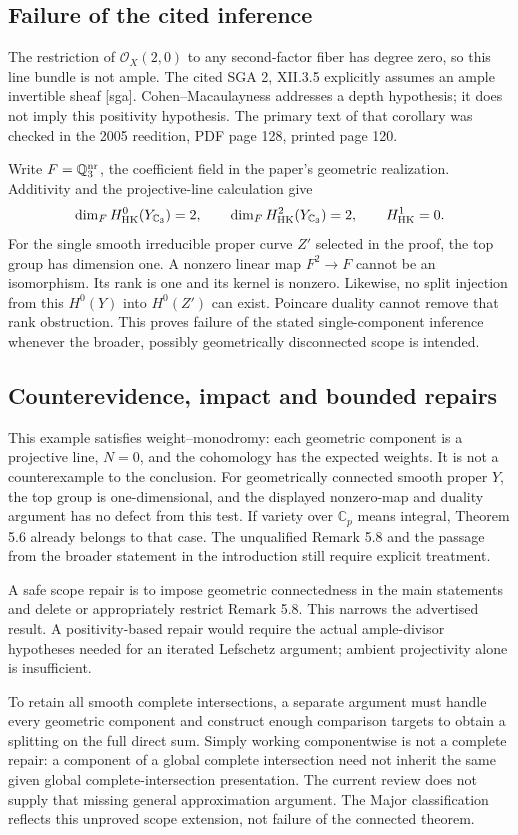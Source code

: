 \documentclass[10pt]{article}
\begin{document}
\subsection*{Failure of the cited inference}
The restriction of \(\mathcal O_X(2,0)\) to any second-factor fiber has degree zero, so this line bundle is not ample. The cited SGA 2, XII.3.5 explicitly assumes an ample invertible sheaf [sga]. Cohen–Macaulayness addresses a depth hypothesis; it does not imply this positivity hypothesis. The primary text of that corollary was checked in the 2005 reedition, PDF page 128, printed page 120.\par
Write \(F=\mathbb Q_3^{\rm nr}\), the coefficient field in the paper’s geometric realization. Additivity and the projective-line calculation give \[\dim_F H^0_{\rm HK}(Y_{\mathbb C_3})=2,\qquad
 \dim_F H^2_{\rm HK}(Y_{\mathbb C_3})=2,\qquad H^1_{\rm HK}=0.\] For the single smooth irreducible proper curve \(Z'\) selected in the proof, the top group has dimension one. A nonzero linear map \(F^2\to F\) cannot be an isomorphism. Its rank is one and its kernel is nonzero. Likewise, no split injection from this \(H^0(Y)\) into \(H^0(Z')\) can exist. Poincare duality cannot remove that rank obstruction. This proves failure of the stated single-component inference whenever the broader, possibly geometrically disconnected scope is intended.\par
\subsection*{Counterevidence, impact and bounded repairs}
This example satisfies weight–monodromy: each geometric component is a projective line, \(N=0\), and the cohomology has the expected weights. It is not a counterexample to the conclusion. For geometrically connected smooth proper \(Y\), the top group is one-dimensional, and the displayed nonzero-map and duality argument has no defect from this test. If variety over \(\mathbb C_p\) means integral, Theorem 5.6 already belongs to that case. The unqualified Remark 5.8 and the passage from the broader statement in the introduction still require explicit treatment.\par
A safe scope repair is to impose geometric connectedness in the main statements and delete or appropriately restrict Remark 5.8. This narrows the advertised result. A positivity-based repair would require the actual ample-divisor hypotheses needed for an iterated Lefschetz argument; ambient projectivity alone is insufficient.\par
To retain all smooth complete intersections, a separate argument must handle every geometric component and construct enough comparison targets to obtain a splitting on the full direct sum. Simply working componentwise is not a complete repair: a component of a global complete intersection need not inherit the same given global complete-intersection presentation. The current review does not supply that missing general approximation argument. The Major classification reflects this unproved scope extension, not failure of the connected theorem.\par
\end{document}
